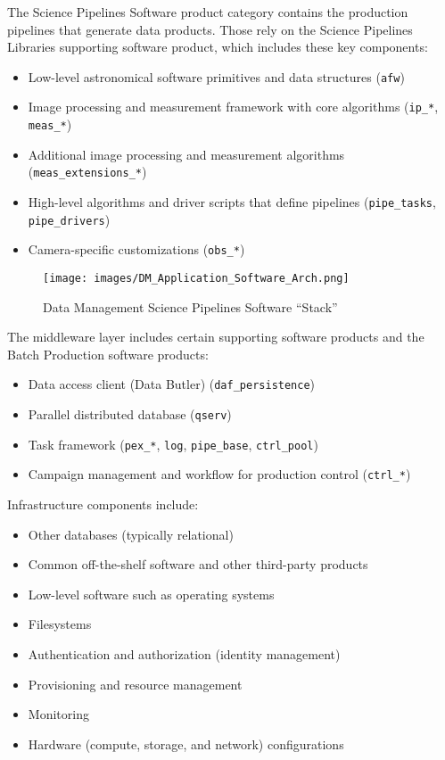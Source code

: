 \documentclass[DM,toc,lsstdraft]{lsstdoc}
\begin{document}
The Science Pipelines Software product category contains the production pipelines that generate data products.
Those rely on the Science Pipelines Libraries supporting software product, which includes these key components:
\begin{itemize}
\item
  Low-level astronomical software primitives and data structures
  (\texttt{afw})
\item
  Image processing and measurement framework with core algorithms
  (\texttt{ip\_*}, \texttt{meas\_*})
\item
  Additional image processing and measurement algorithms
  (\texttt{meas\_extensions\_*})
\item
  High-level algorithms and driver scripts that define pipelines
  (\texttt{pipe\_tasks}, \texttt{pipe\_drivers})
\item
  Camera-specific customizations (\texttt{obs\_*})
\end{itemize}

\begin{figure}
\centering
\texttt{[image: images/DM\_Application\_Software\_Arch.png]}
\caption{Data Management Science Pipelines Software ``Stack''}
\label{fig:scipi}
\end{figure}

The middleware layer includes certain supporting software products and the Batch Production software products:
\begin{itemize}
\item
  Data access client (Data Butler) (\texttt{daf\_persistence})
\item
  Parallel distributed database (\texttt{qserv})
\item
  Task framework (\texttt{pex\_*}, \texttt{log}, \texttt{pipe\_base},
  \texttt{ctrl\_pool})
\item
  Campaign management and workflow for production control (\texttt{ctrl\_*})
\end{itemize}

Infrastructure components include:
\begin{itemize}
\item
  Other databases (typically relational)
\item
  Common off-the-shelf software and other third-party products
\item
  Low-level software such as operating systems
\item
  Filesystems
\item
  Authentication and authorization (identity management)
\item
  Provisioning and resource management
\item
  Monitoring
\item
  Hardware (compute, storage, and network) configurations
\end{itemize}
\end{document}
